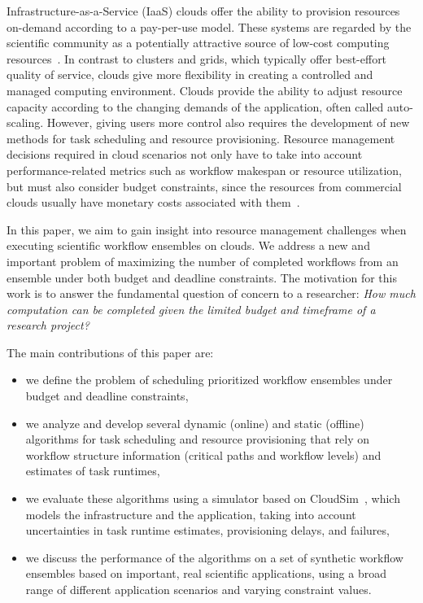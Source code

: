 \documentclass[preprint,5p]{elsarticle}
\begin{document}
Infrastructure-as-a-Service (IaaS) clouds offer the ability to provision 
resources on-demand according to a pay-per-use model. These systems 
are regarded by the scientific community as a potentially attractive source of 
low-cost computing resources~\cite{Ostermann2010, Keahey2009}. In contrast 
to clusters and grids, which typically offer best-effort quality of service, clouds 
give more flexibility in creating a controlled and managed computing environment.
Clouds provide the ability to adjust resource capacity according to the changing
demands of the application, often called auto-scaling. However, giving users 
more control also requires the development of new methods for task 
scheduling and resource provisioning. Resource management decisions required 
in cloud scenarios not only have to take into account performance-related 
metrics such as workflow makespan or resource utilization, but must also consider
budget constraints, since the resources from commercial clouds
usually have monetary costs associated with them~\cite{Durkee2010}.

In this paper, we aim to gain insight into resource management challenges when
executing scientific workflow ensembles on clouds. We address a
new and important problem of maximizing the number of completed workflows from
an ensemble under both budget and deadline constraints. The motivation for this
work is to answer the fundamental question of concern to a researcher: {\em How much
computation can be completed given the limited budget and timeframe of a
research project?} 

The main contributions of this paper are:
\begin{itemize}
  \item we define the problem of scheduling prioritized workflow ensembles
  under budget and deadline constraints,
  \item we analyze and develop several dynamic (online) and static (offline) 
  algorithms for task scheduling and resource provisioning that rely on workflow 
  structure information (critical paths and workflow levels) and estimates of 
  task runtimes,
  \item we evaluate these algorithms using a simulator based on 
  CloudSim~\cite{Calheiros2011}, which models the infrastructure and the 
  application, taking into account uncertainties in task runtime estimates, 
  provisioning delays, and failures, 
  \item we discuss the performance of the algorithms on a set of
  synthetic workflow ensembles based on important, real scientific
  applications, using a broad range of different application scenarios and
  varying constraint values.
\end{itemize}
\end{document}

